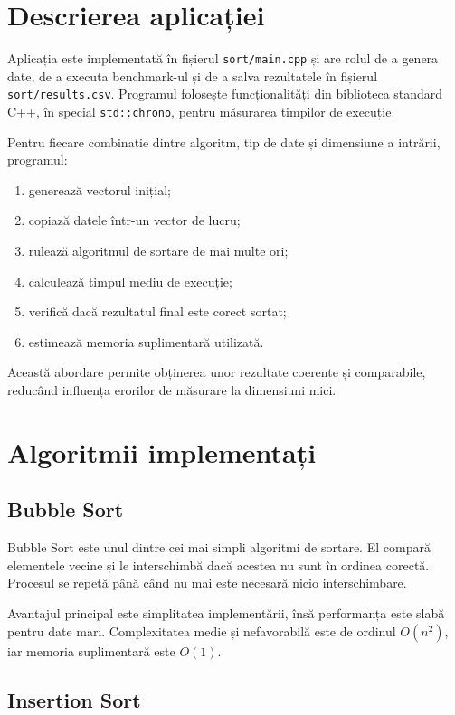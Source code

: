 \documentclass[12pt,a4paper]{article}
\begin{document}
\section{Descrierea aplicației}

Aplicația este implementată în fișierul \texttt{sort/main.cpp} și are rolul de a genera date, de a executa benchmark-ul și de a salva rezultatele în fișierul \texttt{sort/results.csv}. Programul folosește funcționalități din biblioteca standard C++, în special \texttt{std::chrono}, pentru măsurarea timpilor de execuție.

Pentru fiecare combinație dintre algoritm, tip de date și dimensiune a intrării, programul:

\begin{enumerate}
    \item generează vectorul inițial;
    \item copiază datele într-un vector de lucru;
    \item rulează algoritmul de sortare de mai multe ori;
    \item calculează timpul mediu de execuție;
    \item verifică dacă rezultatul final este corect sortat;
    \item estimează memoria suplimentară utilizată.
\end{enumerate}

Această abordare permite obținerea unor rezultate coerente și comparabile, reducând influența erorilor de măsurare la dimensiuni mici.

\section{Algoritmii implementați}

\subsection{Bubble Sort}

Bubble Sort este unul dintre cei mai simpli algoritmi de sortare. El compară elementele vecine și le interschimbă dacă acestea nu sunt în ordinea corectă. Procesul se repetă până când nu mai este necesară nicio interschimbare.

Avantajul principal este simplitatea implementării, însă performanța este slabă pentru date mari. Complexitatea medie și nefavorabilă este de ordinul $O(n^2)$, iar memoria suplimentară este $O(1)$.

\subsection{Insertion Sort}
\end{document}
